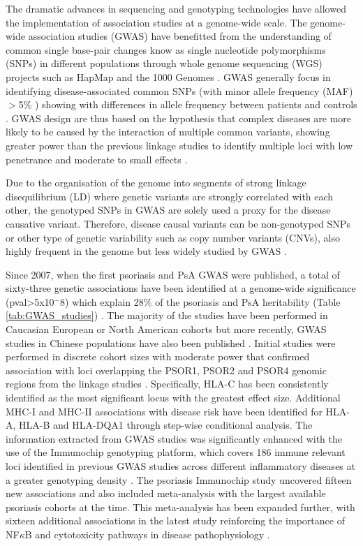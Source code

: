 The dramatic advances in sequencing and genotyping technologies have allowed the implementation of association studies at a genome-wide scale. The genome-wide association studies (GWAS) have benefitted from the understanding of common single base-pair changes know as single nucleotide polymorphisms (SNPs) in different populations through whole genome sequencing (WGS) projects such as HapMap \parencite{The international HapMaP Consortium} and the 1000 Genomes \parencite{The 1000 Genomes}. GWAS generally focus in identifying disease-associated common SNPs (with minor allele frequency (MAF) ${>}$5\% ) showing with differences in allele frequency between patients and controls \parencite{Ku2010}. GWAS design are thus based on the hypothesis that complex diseases are more likely to be caused by the interaction of multiple common variants, showing greater power than the previous linkage studies to identify multiple loci with low penetrance and moderate to small effects \parencite{Schork2009, Cui2010}. 

Due to the organisation of the genome into segments of strong linkage disequilibrium (LD) where genetic variants are strongly correlated with each other, the genotyped SNPs in GWAS are solely used a proxy for the disease causative variant. Therefore, disease causal variants can be non-genotyped SNPs or other type of genetic variability such as copy number variants (CNVs), also highly frequent in the genome but less widely studied by GWAS \parencite{Hirschhorn2005, Ku2010}. 

Since 2007, when the first psoriasis and PsA GWAS were published, a total of sixty-three genetic associations have been identified at a genome-wide significance (pval>5x10$^-8$) which explain 28\% of the psoriasis and PsA heritability (Table \ref{tab:GWAS_studies}) \parencite{Tsoi2017}. The majority of the studies have been performed in Caucasian European or North American cohorts but more recently, GWAS studies in Chinese populations have also been published \parencite{Zhang2009, Sun2010, Yin2015}. Initial studies were performed in discrete cohort sizes with moderate power that confirmed association with loci overlapping the PSOR1, PSOR2 and PSOR4 genomic regions from the linkage studies \parencite{Strange2010}. Specifically, HLA-C has been consistently identified as the most significant locus with the greatest effect size. Additional MHC-I and MHC-II associations with disease risk have been identified for HLA-A, HLA-B and HLA-DQA1 through step-wise conditional analysis\parencite{Okada2014}. The information extracted from GWAS studies was significantly enhanced with the use of the Immunochip genotyping platform, which covers 186 immune relevant loci identified in previous GWAS studies across different inflammatory diseases at a greater genotyping density \parencite{Tsoi2012}. The psoriasis Immunochip study uncovered fifteen new associations and also included meta-analysis with the largest available psoriasis cohorts at the time\parencite{Tsoi2012}. This meta-analysis has been expanded further, with sixteen additional associations in the latest study reinforcing the importance of NF$\kappa$B and cytotoxicity pathways in disease pathophysiology \parencite{Tsoi2015,Tsoi2017}.

